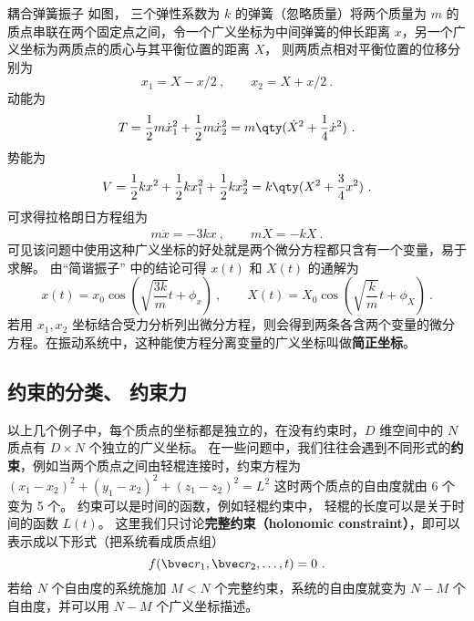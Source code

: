 \begin{example}{耦合弹簧振子}\label{ex_Lagrng_2}
如图， 三个弹性系数为 $k$ 的弹簧（忽略质量）将两个质量为 $m$ 的质点串联在两个固定点之间，令一个广义坐标为中间弹簧的伸长距离 $x$，另一个广义坐标为两质点的质心与其平衡位置的距离 $X$， 则两质点相对平衡位置的位移分别为
\begin{equation}
x_1=X-x/2~, \qquad x_2 = X+x/2~.
\end{equation}
动能为
\begin{equation}
T=\frac12 m\dot x_1^2 + \frac12 m\dot x_2^2 = m \qty(\dot X^2 + \frac14 \dot x^2)~.
\end{equation}
势能为
\begin{equation}
V = \frac12 k x^2 + \frac12 kx_1^2 + \frac12 k x_2^2 = k\qty(X^2 + \frac34 x^2)~.
\end{equation}
可求得拉格朗日方程组为
\begin{equation}
m\ddot x =  - 3kx~, \qquad m\ddot X =  - kX~.
\end{equation}
可见该问题中使用这种广义坐标的好处就是两个微分方程都只含有一个变量，易于求解。 由“简谐振子” 中的结论可得 $x(t)$ 和 $X(t)$ 的通解为
\begin{equation}
x(t) = x_0 \cos(\sqrt{\frac{3k}{m}} t + \phi_x)~,
\qquad
X(t) = X_0 \cos(\sqrt{\frac{k}{m}} t + \phi_X)~.
\end{equation}
若用 $x_1, x_2$ 坐标结合受力分析列出微分方程，则会得到两条各含两个变量的微分方程。在振动系统中，这种能使方程分离变量的广义坐标叫做\textbf{简正坐标}。%
\end{example}

\subsection{约束的分类、 约束力}

以上几个例子中，每个质点的坐标都是独立的，在没有约束时，$D$ 维空间中的 $N$ 质点有 $D\times N$ 个独立的广义坐标。 在一些问题中，我们往往会遇到不同形式的\textbf{约束}，例如当两个质点之间由轻棍连接时，约束方程为 $(x_1-x_2)^2+(y_1-x_2)^2+(z_1-z_2)^2=L^2$ 这时两个质点的自由度就由 6 个变为 5 个。 约束可以是时间的函数，例如轻棍约束中， 轻棍的长度可以是关于时间的函数 $L(t)$。 这里我们只讨论\textbf{完整约束（holonomic constraint）}，即可以表示成以下形式（把系统看成质点组）
\begin{equation}\label{eq_Lagrng_3}
f(\bvec r_1,\bvec r_2,\dots,t) = 0~.
\end{equation}
若给 $N$ 个自由度的系统施加 $M<N$ 个完整约束，系统的自由度就变为 $N-M$ 个自由度，并可以用 $N-M$ 个广义坐标描述。

